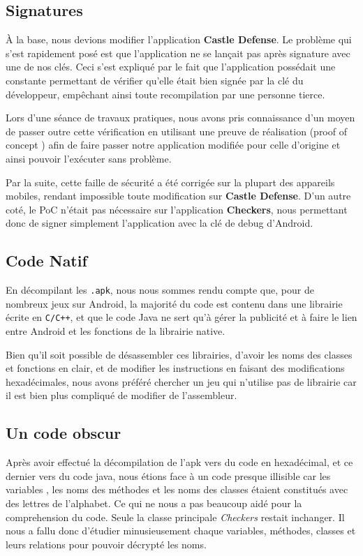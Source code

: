 \subsection{Signatures}

À la base, nous devions modifier l'application \textbf{Castle Defense}.
Le problème qui s'est rapidement posé est que l'application ne se lançait pas après signature avec une de nos clés.
Ceci s'est expliqué par le fait que l'application possédait une constante permettant de vérifier qu'elle était bien signée par la clé du développeur,
empêchant ainsi toute recompilation par une personne tierce.

Lors d'une séance de travaux pratiques, nous avons pris connaissance d'un moyen de passer outre cette vérification en utilisant une preuve de réalisation
(proof of concept \cite{PoC}) afin de faire passer notre application modifiée pour celle d'origine et ainsi pouvoir l'exécuter sans problème.

Par la suite, cette faille de sécurité a été corrigée sur la plupart des appareils mobiles,
rendant impossible toute modification sur \textbf{Castle Defense}.
D'un autre coté, le PoC n'était pas nécessaire sur l'application \textbf{Checkers},
nous permettant donc de signer simplement l'application avec la clé de debug d'Android.


\subsection{Code Natif}

En décompilant les \texttt{.apk}, nous nous sommes rendu compte que, pour de nombreux jeux sur Android, la majorité du code est contenu dans une librairie écrite en \texttt{C/C++}, et que le code Java ne sert qu'à gérer la publicité et à faire le lien entre Android et les fonctions de la librairie native.

Bien qu'il soit possible de désassembler ces librairies, d'avoir les noms des classes et fonctions en clair, et de modifier les instructions en faisant des modifications hexadécimales, nous avons préféré chercher un jeu qui n'utilise pas de librairie car il est bien plus compliqué de modifier de l'assembleur.

\subsection{Un code obscur}
Après avoir effectué la décompilation de l'apk vers du code en hexadécimal, et ce dernier vers du code java, nous étions face à un code presque illisible car les variables
, les noms des méthodes et les noms des classes étaient constitués avec des lettres de l'alphabet. Ce qui ne nous a pas beaucoup aidé pour la comprehension du code.
Seule la classe principale \textit{Checkers} restait inchanger. Il nous a fallu donc d'étudier minusieusement chaque variables, méthodes, classes et leurs relations pour pouvoir
décrypté les noms.
